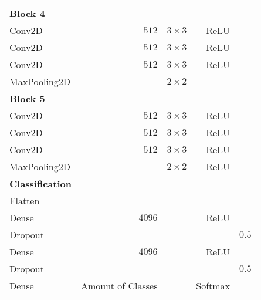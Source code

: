 \begin{table}[H]
\begin{tabular}{lrrrr}
		\textbf{Block 4}        &                           &                           &                     &                \\
		\rowcolor{lightGrey}  
		Conv2D                  & $512$                     & $3\times3$                & ReLU                &                \\
		Conv2D                  & $512$                     & $3\times3$                & ReLU                &                \\
		\rowcolor{lightGrey}  
		Conv2D                  & $512$                     & $3\times3$                & ReLU                &                \\
		MaxPooling2D            &             &          $2\times2$                  &                     &                \\
		\textbf{Block 5}        &                           &                           &                     &                \\
		\rowcolor{lightGrey}  
		Conv2D                  & $512$                     & $3\times3$                & ReLU                &                \\
		Conv2D                  & $512$                     & $3\times3$                & ReLU                &                \\
		\rowcolor{lightGrey}  
		Conv2D                  & $512$                     & $3\times3$                & ReLU                &                \\
		MaxPooling2D            &               &        $2\times2$        & ReLU                &                \\
		\textbf{Classification} &                           &                           &                     &                \\
		\rowcolor{lightGrey}  
		Flatten                 &                           &                           &                     &                \\
		Dense                   & $4096$                    &                           & ReLU                &                \\
		\rowcolor{lightGrey}  
		Dropout                 &                           &                           &                     & $0.5$          \\
		Dense                   & $4096$                    &                           & ReLU                &                \\
		\rowcolor{lightGrey} 
		Dropout                 &                           &                           &                     & $0.5$          \\
		Dense                   & Amount of Classes         &                           & Softmax             &               
	\end{tabular}
\end{table}

